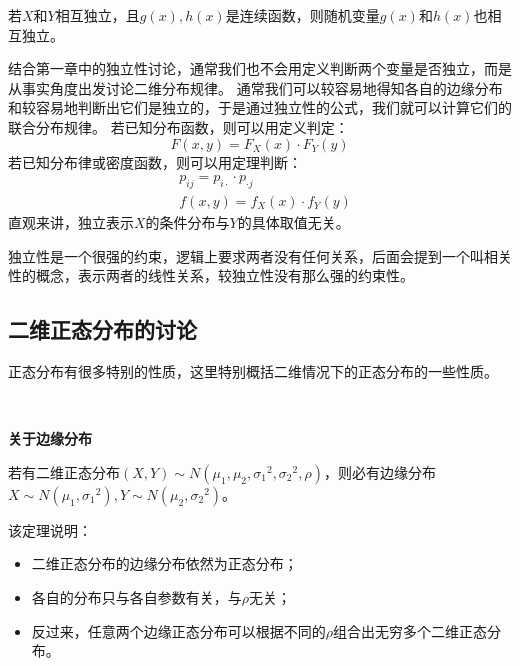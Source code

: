 \begin{theorem}
若$X$和$Y$相互独立，且$g\left( x \right) ,h\left( x \right) $是连续函数，则随机变量$g\left( x \right) $和$h\left( x \right) $也相互独立。
\end{theorem}

结合第一章中的独立性讨论，通常我们也不会用定义判断两个变量是否独立，而是从事实角度出发讨论二维分布规律。
通常我们可以较容易地得知各自的边缘分布和较容易地判断出它们是独立的，于是通过独立性的公式，我们就可以计算它们的联合分布规律。
若已知分布函数，则可以用定义判定：
\[
F\left( x,y \right) =F_X\left( x \right) \cdot F_Y\left( y \right)
\]
若已知分布律或密度函数，则可以用定理判断：
\begin{align*}
&p_{ij}=p_{i\cdot}\cdot p_{\cdot j} \\
&f\left( x,y \right) =f_X\left( x \right) \cdot f_Y\left( y \right)
\end{align*}
直观来讲，独立表示$X$的条件分布与$Y$的具体取值无关。

\begin{tcolorbox}
独立性是一个很强的约束，逻辑上要求两者没有任何关系，后面会提到一个叫相关性的概念，表示两者的线性关系，较独立性没有那么强的约束性。
\end{tcolorbox}

\subsection{二维正态分布的讨论}

正态分布有很多特别的性质，这里特别概括二维情况下的正态分布的一些性质。

~

{\bf 关于边缘分布}

\begin{theorem}
若有二维正态分布$\left( X,Y \right) \sim N\left( \mu _1,\mu _2,{\sigma _1}^2,{\sigma _2}^2,\rho \right) $，则必有边缘分布$X\sim N\left( \mu _1,{\sigma _1}^2 \right) ,Y\sim N\left( \mu _2,{\sigma _2}^2 \right) $。
\end{theorem}

该定理说明：
\begin{itemize}
    \item 二维正态分布的边缘分布依然为正态分布；
    \item 各自的分布只与各自参数有关，与$\rho $无关；
    \item 反过来，任意两个边缘正态分布可以根据不同的$\rho $组合出无穷多个二维正态分布。
\end{itemize}

